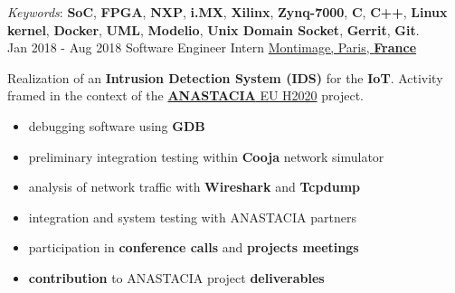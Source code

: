 \documentclass[letterpaper]{twentysecondcv} %
\begin{document}
\begin{twenty}
{            \vspace{1 mm}
            \textit{Keywords}: \textbf{SoC}, \textbf{FPGA}, \textbf{NXP}, \textbf{i.MX}, \textbf{Xilinx}, \textbf{Zynq-7000}, \textbf{C}, \textbf{C++}, \textbf{Linux kernel}, \textbf{Docker}, \textbf{UML}, \textbf{Modelio}, \textbf{Unix Domain Socket}, \textbf{Gerrit}, \textbf{Git}.
        }\\
    \twentyitem
    	{Jan 2018 -}
		{Aug 2018}
        {Software Engineer Intern}
        {\href{https://www.montimage.com/}{Montimage, Paris, \textbf{France}}}
        {}
        {
            Realization of an \textbf{Intrusion Detection System (IDS)} for the \textbf{IoT}. Activity framed in the context of the \href{http://www.anastacia-h2020.eu/}{\textbf{ANASTACIA} EU H2020} project.
            \vspace{1 mm}
            \begin{itemize}
                \item debugging software using \textbf{GDB}
                \item preliminary integration testing within \textbf{Cooja} network simulator
                \item analysis of network traffic with \textbf{Wireshark} and \textbf{Tcpdump}
                \item integration and system testing with ANASTACIA partners
                \item participation in \textbf{conference calls} and \textbf{projects meetings}
                \item \textbf{contribution} to ANASTACIA project \textbf{deliverables}
            \end{itemize}

}
\end{twenty}
\end{document}
